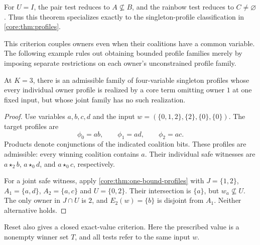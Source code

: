 For $U=I$, the pair test reduces to $A\nsubseteq B$, and the rainbow test
reduces to $C\ne\varnothing$. Thus this theorem specializes exactly to
the singleton-profile classification in \cref{core:thm:profiles}.

This criterion couples owners even when their coalitions have a common
variable. The following example rules out obtaining bounded profile
families merely by imposing separate restrictions on each owner's
unconstrained profile family.

\begin{corollary}\label{core:cor:profile-bound}
At $K=3$, there is an admissible family of four-variable singleton profiles
whose every individual owner profile is realized by a core term omitting
owner $1$ at one fixed input, but whose joint family has no such realization.
\end{corollary}
\begin{proof}
Use variables $a,b,c,d$ and the input
$w=(\{0,1,2\},\{2\},\{0\},\{0\})$. The target profiles are
\[
 \phi_0=ab,\qquad \phi_1=ad,\qquad \phi_2=ac.
\]
Products denote conjunctions of the indicated coalition bits. These
profiles are admissible: every winning coalition contains $a$. Their
individual safe witnesses are $a\star_2 b$, $a\star_0 d$, and
$a\star_0 c$, respectively.

For a joint safe witness, apply \cref{core:thm:one-bound-profiles} with
$J=\{1,2\}$, $A_1=\{a,d\}$, $A_2=\{a,c\}$ and $U=\{0,2\}$.
Their intersection is $\{a\}$, but $w_a\nsubseteq U$. The only owner in
$J\cap U$ is $2$, and $E_2(w)=\{b\}$ is disjoint from $A_1$.
Neither alternative holds.
\end{proof}

Reset also gives a closed exact-value criterion. Here the prescribed value
is a nonempty winner set $T$, and all tests refer to the same input $w$.

